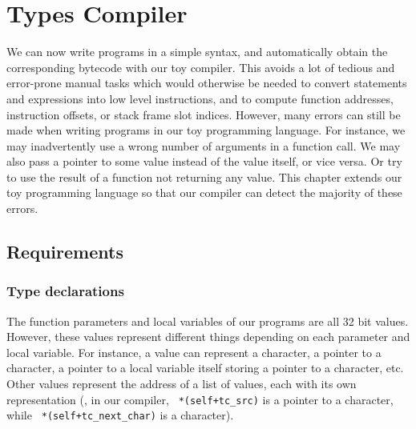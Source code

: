 
\renewcommand{\rustfile}{chapter7}
\setcounter{rustid}{0}


\chapter{Types Compiler}\label{chapter:types-compiler}

We can now write programs in a simple syntax, and automatically obtain the
corresponding bytecode with our toy compiler. This avoids a lot of tedious and
error-prone manual tasks which would otherwise be needed to convert statements
and expressions into low level instructions, and to compute function addresses,
instruction offsets, or stack frame slot indices. However, many errors can
still be made when writing programs in our toy programming language. For
instance, we may inadvertently use a wrong number of arguments in a function
call. We may also pass a pointer to some value instead of the value itself, or
vice versa. Or try to use the result of a function not returning any value.
This chapter extends our toy programming language so that our compiler can
detect the majority of these errors.

\section{Requirements}

\subsection{Type declarations}

The function parameters and local variables of our programs are all 32 bit
values. However, these values represent different things depending on each
parameter and local variable. For instance, a value can represent a character,
a pointer to a character, a pointer to a local variable itself storing a
pointer to a character, etc. Other values represent the address of a list of
values, each with its own representation (\eg, in our compiler, {\tt
*(self+tc\_src)} is a pointer to a character, while {\tt
*(self+tc\_next\_char)} is a character).

